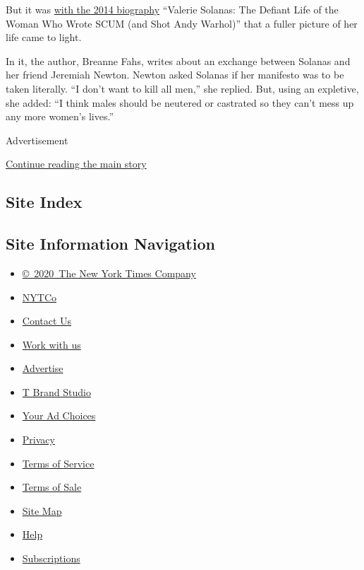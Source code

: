 But it was
\href{https://artsbeat.blogs.nytimes.com/2014/04/23/a-sad-and-remarkable-life-breanne-fahs-talks-about-valerie-solanas/}{with
the 2014 biography} ``Valerie Solanas: The Defiant Life of the Woman Who
Wrote SCUM (and Shot Andy Warhol)'' that a fuller picture of her life
came to light.

In it, the author, Breanne Fahs, writes about an exchange between
Solanas and her friend Jeremiah Newton. Newton asked Solanas if her
manifesto was to be taken literally. ``I don't want to kill all men,''
she replied. But, using an expletive, she added: ``I think males should
be neutered or castrated so they can't mess up any more women's lives.''

Advertisement

\protect\hyperlink{after-bottom}{Continue reading the main story}

\hypertarget{site-index}{%
\subsection{Site Index}\label{site-index}}

\hypertarget{site-information-navigation}{%
\subsection{Site Information
Navigation}\label{site-information-navigation}}

\begin{itemize}
\tightlist
\item
  \href{https://help.nytimes.com/hc/en-us/articles/115014792127-Copyright-notice}{©~2020~The
  New York Times Company}
\end{itemize}

\begin{itemize}
\tightlist
\item
  \href{https://www.nytco.com/}{NYTCo}
\item
  \href{https://help.nytimes.com/hc/en-us/articles/115015385887-Contact-Us}{Contact
  Us}
\item
  \href{https://www.nytco.com/careers/}{Work with us}
\item
  \href{https://nytmediakit.com/}{Advertise}
\item
  \href{http://www.tbrandstudio.com/}{T Brand Studio}
\item
  \href{https://www.nytimes.com/privacy/cookie-policy\#how-do-i-manage-trackers}{Your
  Ad Choices}
\item
  \href{https://www.nytimes.com/privacy}{Privacy}
\item
  \href{https://help.nytimes.com/hc/en-us/articles/115014893428-Terms-of-service}{Terms
  of Service}
\item
  \href{https://help.nytimes.com/hc/en-us/articles/115014893968-Terms-of-sale}{Terms
  of Sale}
\item
  \href{https://spiderbites.nytimes.com}{Site Map}
\item
  \href{https://help.nytimes.com/hc/en-us}{Help}
\item
  \href{https://www.nytimes.com/subscription?campaignId=37WXW}{Subscriptions}
\end{itemize}
